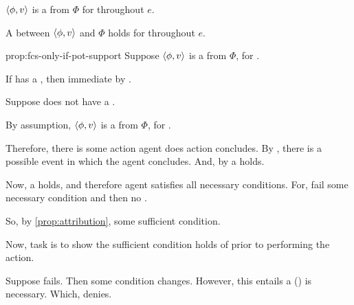 \begin{note}
    \begin{proposition}
    \label{prop:fcs-only-if-pot-support}
    \vspace{-\baselineskip}
    \begin{itenum}
    \item[\emph{If}:]
      \(\langle \phi, v \rangle\) is a  from \(\Phi\) for \vAgent{} throughout \(e\).
    \item[\emph{Then}:]
      A  between \(\langle \phi, v \rangle\) and \(\Phi\) holds for \vAgent{} throughout \(e\).
    \end{itenum}
    \vspace{-\baselineskip}
  \end{proposition}

  \begin{argument}{prop:fcs-only-if-pot-support}
    Suppose \(\langle \phi, v \rangle\) is a  from \(\Phi\), for \vAgent{}.

    If \vAgent{} has a \wit{}, then immediate by \supportI{}.

    Suppose \vAgent{} does not have a \wit{}.

    By assumption, \(\langle \phi, v \rangle\) is a  from \(\Phi\), for \vAgent{}.


    Therefore, there is some action agent does action concludes.
    By \assuPP{}, there is a possible event in which the agent concludes.
    And, by \supportI{} a \ros{} holds.

    Now, a \ros{} holds, and therefore agent satisfies all necessary conditions.
    For, fail some necessary condition and then no \ros{}.

    So, by \autoref{prop:attribution}, some sufficient condition.

    Now, task is to show the sufficient condition holds of \vAgent{} prior to performing the action.

    Suppose fails.
    Then some condition changes.
    However, this entails a (\pwP{}) \wit{} is necessary.
    Which, \supportII{} denies.
  \end{argument}
\end{note}


